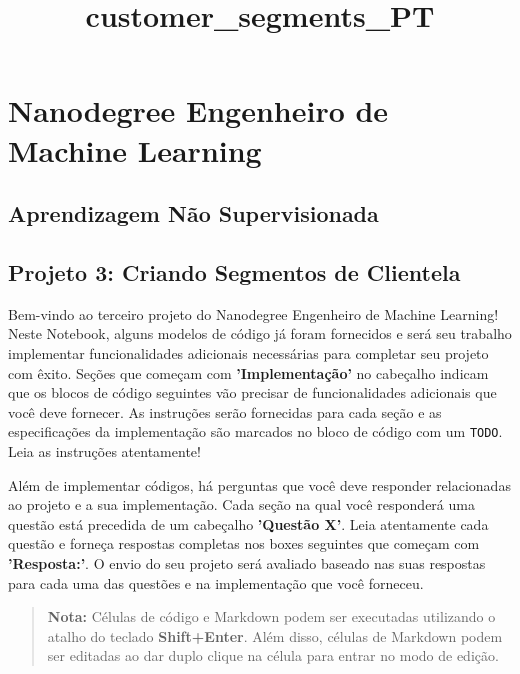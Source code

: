 \documentclass[11pt]{article}
\title{customer\_segments\_PT}
\begin{document}
    
    
    \maketitle
    
    

    
    \section{Nanodegree Engenheiro de Machine
Learning}\label{nanodegree-engenheiro-de-machine-learning}

\subsection{Aprendizagem Não
Supervisionada}\label{aprendizagem-nuxe3o-supervisionada}

\subsection{Projeto 3: Criando Segmentos de
Clientela}\label{projeto-3-criando-segmentos-de-clientela}

    Bem-vindo ao terceiro projeto do Nanodegree Engenheiro de Machine
Learning! Neste Notebook, alguns modelos de código já foram fornecidos e
será seu trabalho implementar funcionalidades adicionais necessárias
para completar seu projeto com êxito. Seções que começam com
\textbf{'Implementação'} no cabeçalho indicam que os blocos de código
seguintes vão precisar de funcionalidades adicionais que você deve
fornecer. As instruções serão fornecidas para cada seção e as
especificações da implementação são marcados no bloco de código com um
\texttt{\textquotesingle{}TODO\textquotesingle{}}. Leia as instruções
atentamente!

Além de implementar códigos, há perguntas que você deve responder
relacionadas ao projeto e a sua implementação. Cada seção na qual você
responderá uma questão está precedida de um cabeçalho \textbf{'Questão
X'}. Leia atentamente cada questão e forneça respostas completas nos
boxes seguintes que começam com \textbf{'Resposta:'}. O envio do seu
projeto será avaliado baseado nas suas respostas para cada uma das
questões e na implementação que você forneceu.

\begin{quote}
\textbf{Nota:} Células de código e Markdown podem ser executadas
utilizando o atalho do teclado \textbf{Shift+Enter}. Além disso, células
de Markdown podem ser editadas ao dar duplo clique na célula para entrar
no modo de edição.
\end{quote}
\end{document}
